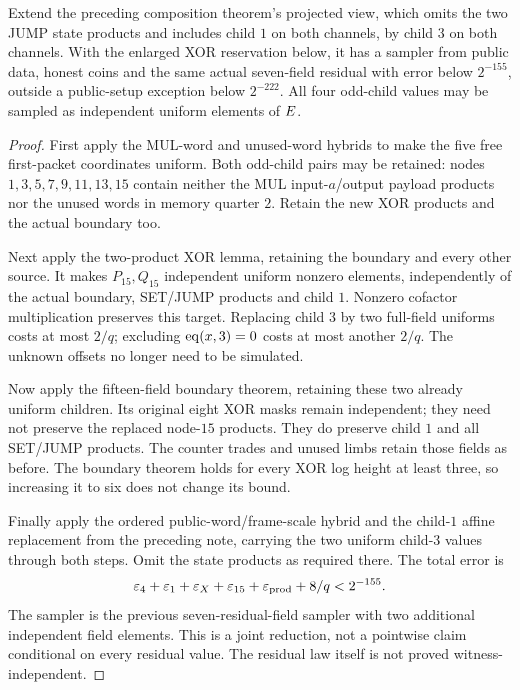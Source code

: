\begin{proposition}
Extend the preceding composition theorem's projected view, which omits the two JUMP state products and includes child $1$ on both channels, by child $3$ on both channels. With the enlarged XOR reservation below, it has a sampler from public data, honest coins and the same actual seven-field residual with error below $2^{-155}$, outside a public-setup exception below $2^{-222}$. All four odd-child values may be sampled as independent uniform elements of $E$.
\end{proposition}
\begin{proof}
First apply the MUL-word and unused-word hybrids to make the five free first-packet coordinates uniform. Both odd-child pairs may be retained: nodes $1,3,5,7,9,11,13,15$ contain neither the MUL input-$a$/output payload products nor the unused words in memory quarter $2$. Retain the new XOR products and the actual boundary too.

Next apply the two-product XOR lemma, retaining the boundary and every other source. It makes $P_{15},Q_{15}$ independent uniform nonzero elements, independently of the actual boundary, SET/JUMP products and child $1$. Nonzero cofactor multiplication preserves this target. Replacing child $3$ by two full-field uniforms costs at most $2/q$; excluding $\operatorname{eq}(x,3)=0$ costs at most another $2/q$. The unknown offsets no longer need to be simulated.

Now apply the fifteen-field boundary theorem, retaining these two already uniform children. Its original eight XOR masks remain independent; they need not preserve the replaced node-$15$ products. They do preserve child $1$ and all SET/JUMP products. The counter trades and unused limbs retain those fields as before. The boundary theorem holds for every XOR log height at least three, so increasing it to six does not change its bound.

Finally apply the ordered public-word/frame-scale hybrid and the child-$1$ affine replacement from the preceding note, carrying the two uniform child-$3$ values through both steps. Omit the state products as required there. The total error is
\[
 \varepsilon_4+\varepsilon_1+\varepsilon_X+\varepsilon_{15}
       +\varepsilon_{\rm prod}+8/q<2^{-155}.
\]
The sampler is the previous seven-residual-field sampler with two additional independent field elements. This is a joint reduction, not a pointwise claim conditional on every residual value. The residual law itself is not proved witness-independent.
\end{proof}

